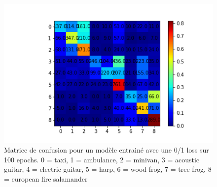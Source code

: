 \documentclass[a4paper]{article}
\begin{document}
\begin{figure}
\centering
\includegraphics[width=1\textwidth]{confusion.png}
\caption{\label{fig:data} Matrice de confusion pour un modèle entrainé avec une 0/1 loss sur 100 epochs. 0 = taxi, 1 = ambulance, 2 = minivan, 3 = acoustic guitar, 4 = electric guitar, 5 = harp, 6 = wood frog, 7 = tree frog, 8 = european fire salamander}
\end{figure}
\end{document}
